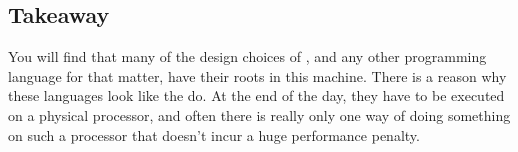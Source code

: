 
\subsection{Takeaway}

You will find that many of the design choices of \csharp, and any other programming language for that matter, have their roots in this machine. There is a reason why these languages look like the do. At the end of the day, they have to be executed on a physical processor, and often there is really only one way of doing something on such a processor that doesn't incur a huge performance penalty.

